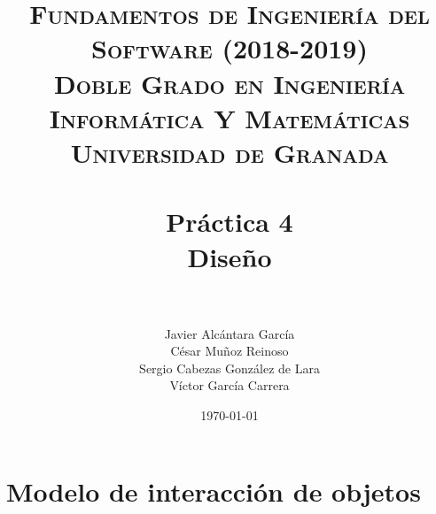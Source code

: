 


\graphicspath{{images/}}


\title{	
\normalfont \normalsize 
\textsc{\textbf{Fundamentos de Ingeniería del Software (2018-2019)} \\ Doble Grado en Ingeniería Informática Y Matemáticas \\ Universidad de Granada} \\ [25pt] %
\horrule{0.5pt} \\[0.4cm] %
\huge \textbf{Práctica 4} \\ Diseño \\ %
\horrule{2pt} \\[0.5cm] %
}

\author{Javier Alcántara García\\ César Muñoz Reinoso \\ Sergio Cabezas González de Lara \\ Víctor García Carrera} %

\date{\normalsize\today} %





\maketitle %

\newpage %

\tableofcontents %

\newpage

\section{Modelo de interacción de objetos}
